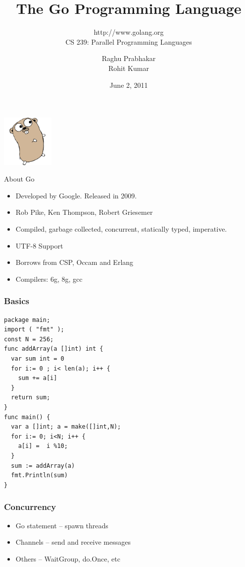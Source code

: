 \documentclass{beamer}
\title{The Go Programming Language}
\subtitle{http://www.golang.org \\ CS 239: Parallel Programming Languages}
\author{Raghu Prabhakar \\ Rohit Kumar}
\date{June 2, 2011}
\begin{document}
\begin{frame}
\begin{center}
\includegraphics[width=1in]{gopher.png}
\end{center}
\titlepage
\end{frame}

\begin{frame} {About Go}
\begin{itemize}
  \item Developed by Google. Released in 2009.
  \item Rob Pike, Ken Thompson, Robert Griesemer
  \item Compiled, garbage collected, concurrent, statically typed,
    imperative. 
  \item UTF-8 Support
  \item Borrows from CSP, Occam and Erlang
  \item Compilers: 6g, 8g, gcc 
\end{itemize}
\end{frame}

\begin{frame}[fragile]
\frametitle{Basics}
    {\small
\begin{verbatim}
package main;
import ( "fmt" );
const N = 256;
func addArray(a []int) int {
  var sum int = 0
  for i:= 0 ; i< len(a); i++ {
    sum += a[i]
  }
  return sum;
}
func main() {
  var a []int; a = make([]int,N);
  for i:= 0; i<N; i++ {
    a[i] =  i %10; 
  }
  sum := addArray(a)
  fmt.Println(sum) 
}		
\end{verbatim}
}
\end{frame}

\begin{frame}[fragile]
\frametitle{Concurrency}
  \begin{itemize}
    \item Go statement -- spawn threads
    \item Channels -- send and receive messages
    \item Others -- WaitGroup, do.Once, etc    
  \end{itemize}
\end{frame}
\end{document}

